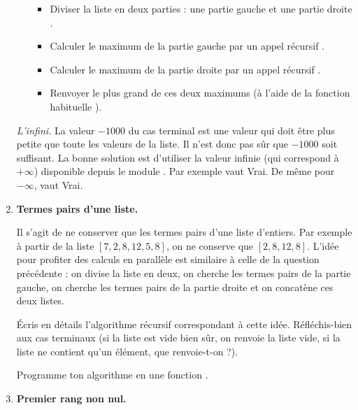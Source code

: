 \documentclass[11pt,class=report,crop=false]{standalone}
\begin{document}
\begin{activite}
\begin{enumerate}
\begin{algorithme}
\begin{itemize}
  \begin{itemize}
     \item Diviser la liste en deux parties : une partie gauche  et une partie droite .
     
     \item Calculer le maximum de la partie gauche par un appel récursif .  
     
    \item Calculer le maximum de la partie droite par un appel récursif .
     
    \item Renvoyer le plus grand de ces deux maximums (à l'aide de la fonction habituelle ).
    
  \end{itemize}   
\end{itemize}  
\end{algorithme}
 
\emph{L'infini.} La valeur $-1000$ du cas terminal est une valeur qui doit être plus petite que toute les valeurs de la liste. Il n'est donc pas sûr que $-1000$ soit suffisant. La bonne solution est d'utiliser la valeur infinie  (qui correspond à $+\infty$) disponible depuis le module . Par exemple \og{}\fg{} vaut \og{}Vrai\fg{}. De même pour $-\infty$, \og{}\fg{} vaut \og{}Vrai\fg{}.


    \item \textbf{Termes pairs d'une liste.}
    
    Il s'agit de ne conserver que les termes pairs d'une liste d'entiers. Par exemple à partir de la liste $[7,2,8,12,5,8]$, on ne conserve que $[2,8,12,8]$.
    L'idée pour profiter des calculs en parallèle est similaire à celle de la question précédente : on divise la liste en deux, on cherche les termes pairs de la partie gauche, on cherche les termes pairs de la partie droite et on concatène ces deux listes.
    
    Écris en détails l'algorithme récursif correspondant à cette idée. Réfléchis-bien aux cas terminaux (si la liste est vide bien sûr, on renvoie la liste vide, si la liste ne contient qu'un élément, que renvoie-t-on ?).
    
    Programme ton algorithme en une fonction .
    
    \item \textbf{Premier rang non nul.}
    

\end{enumerate}
\end{activite}
\end{document}
